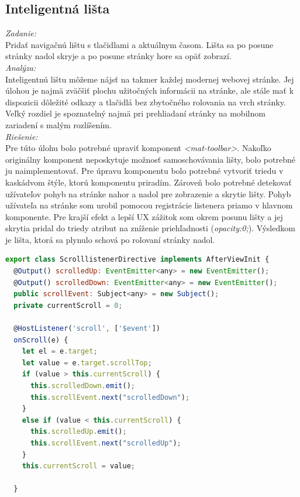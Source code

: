 \documentclass[11pt, oneside]{report}
\begin{document}
\subsection{Inteligentná lišta }
\textit{Zadanie:}\\
Pridať navigačnú lištu s tlačidlami a aktuálnym časom. Lišta sa po posune stránky nadol skryje a po posune stránky hore sa opäť zobrazí.
\\\textit{Analýza:}\\
Inteligentnú lištu môžeme nájsť na takmer každej modernej webovej stránke. Jej úlohou je najmä zväčšiť plochu užitočných informácii na stránke, ale stále mať k dispozicii dôležité odkazy a tlačidlá  bez  zbytočného rolovania na vrch stránky. Veľký rozdiel je spoznatelný najmä pri prehliadaní stránky na mobilnom zariadení s malým rozlíšením. 
\\\textit{Riešenie:}\\
Pre túto úlohu bolo potrebné upraviť komponent \textit{<mat-toolbar>}. Nakoľko originálny komponent neposkytuje možnosť samoschovávania lišty, bolo potrebné ju naimplementovať. Pre úpravu komponentu bolo potrebné vytvoriť triedu v kaskádvom štýle, ktorú komponentu priradím. Zároveň bolo potrebné detekovať užívateľov pohyb na stránke nahor a nadol pre zobrazenie a skrytie lišty. Pohyb  užívateľa na stránke som urobil pomocou registrácie listenera priamo v hlavnom komponente.  Pre krajší efekt a lepší UX  zážitok  som okrem posunu lišty a jej skrytia pridal do triedy  atribut na zníženie priehľadnosti (\textit{opacity:0;}). Výsledkom je  lišta, ktorá sa plynulo schová po rolovaní stránky nadol. 
\begin{lstlisting}[language=Javascript,showstringspaces=false, caption= Event na odchytávanie rolovania stránky,captionpos=b]
export class ScrolllistenerDirective implements AfterViewInit {
  @Output() scrolledUp: EventEmitter<any> = new EventEmitter();
  @Output() scrolledDown: EventEmitter<any> = new EventEmitter();
  public scrollEvent: Subject<any> = new Subject();
  private currentScroll = 0;

  @HostListener('scroll', ['$event'])
  onScroll(e) {
    let el = e.target;
    let value = e.target.scrollTop;
    if (value > this.currentScroll) {
      this.scrolledDown.emit();
      this.scrollEvent.next("scrolledDown");
    }
    else if (value < this.currentScroll) {
      this.scrolledUp.emit();
      this.scrollEvent.next("scrolledUp");
    }
    this.currentScroll = value;

  }
\end{lstlisting}
\end{document}
